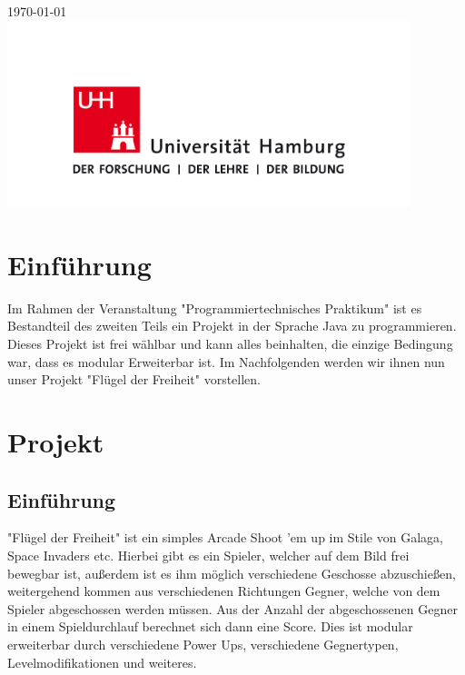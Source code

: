 \begin{titlepage}

{\large \today}\\[2cm] %


\includegraphics[width=0.88\textwidth]{logo.jpg}\\ %
 

\vfill %

\end{titlepage}

\section{Einführung}

Im Rahmen der Veranstaltung "Programmiertechnisches Praktikum" ist es Bestandteil des zweiten Teils ein Projekt in der Sprache Java zu programmieren. Dieses Projekt ist frei wählbar und kann alles beinhalten, die einzige Bedingung war, dass es modular Erweiterbar ist. Im Nachfolgenden werden wir ihnen nun unser Projekt "Flügel der Freiheit" vorstellen. 

\section{Projekt}
\subsection{Einführung}
"Flügel der Freiheit" ist ein simples Arcade Shoot 'em up im Stile von Galaga, Space Invaders etc. Hierbei gibt es  ein Spieler, welcher auf dem Bild frei bewegbar ist, außerdem ist es ihm möglich verschiedene Geschosse abzuschießen, weitergehend kommen aus verschiedenen Richtungen Gegner, welche von dem Spieler abgeschossen werden müssen. Aus der Anzahl der abgeschossenen Gegner in einem Spieldurchlauf berechnet sich dann eine Score. Dies ist modular erweiterbar durch verschiedene Power Ups, verschiedene Gegnertypen, Levelmodifikationen und weiteres. 
